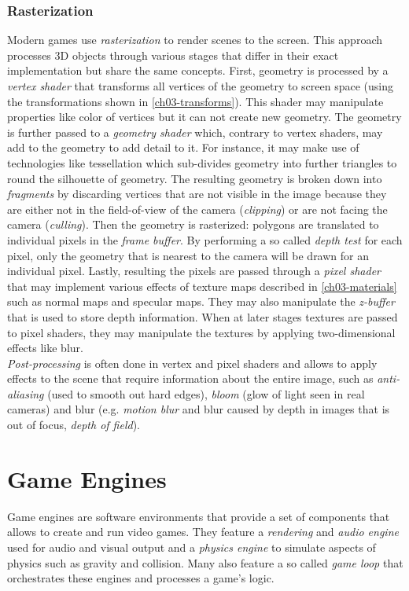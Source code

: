 \subsubsection{Rasterization} Modern games use \emph{rasterization} to render scenes to the screen. This approach processes 3D objects through various stages that differ in their exact implementation but share the same concepts. First, geometry is processed by a \emph{vertex shader} that transforms all vertices of the geometry to screen space (using the transformations shown in \ref{ch03-transforms}). This shader may manipulate properties like color of vertices but it can not create new geometry. The geometry is further passed to a \emph{geometry shader} which, contrary to vertex shaders, may add to the geometry to add detail to it. For instance, it may make use of technologies like tessellation which sub-divides geometry into further triangles to round the silhouette of geometry. The resulting geometry is broken down into \emph{fragments} by discarding vertices that are not visible in the image because they are either not in the field-of-view of the camera (\emph{clipping}) or are not facing the camera (\emph{culling}).
Then the geometry is rasterized: polygons are translated to individual pixels in the \emph{frame buffer}. By performing a so called \emph{depth test} for each pixel, only the geometry that is nearest to the camera will be drawn for an individual pixel.
Lastly, resulting the pixels are passed through a \emph{pixel shader} that may implement various effects of texture maps described in \ref{ch03-materials} such as normal maps and specular maps. They may also manipulate the \emph{z-buffer} that is used to store depth information. When at later stages textures are passed to pixel shaders, they may manipulate the textures by applying two-dimensional effects like blur.\\
\emph{Post-processing} is often done in vertex and pixel shaders and allows to apply effects to the scene that require information about the entire image, such as \emph{anti-aliasing} (used to smooth out hard edges), \emph{bloom} (glow of light seen in real cameras) and blur (e.g. \emph{motion blur} and blur caused by depth in images that is out of focus, \emph{depth of field}).

\section{Game Engines}
Game engines are software environments that provide a set of components that allows to create and run video games. They feature a \emph{rendering} and \emph{audio engine} used for audio and visual output and a \emph{physics engine} to simulate aspects of physics such as gravity and collision. Many also feature a so called \emph{game loop} that orchestrates these engines and processes a game's logic.

